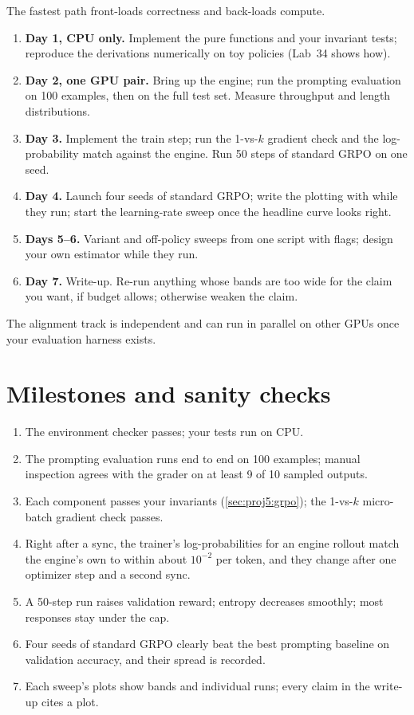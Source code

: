The fastest path front-loads correctness and back-loads compute.
\begin{enumerate}
\item \textbf{Day 1, CPU only.} Implement the pure functions and your invariant tests; reproduce the
  derivations numerically on toy policies (Lab~34 shows how).
\item \textbf{Day 2, one GPU pair.} Bring up the engine; run the prompting evaluation on 100 examples,
  then on the full test set. Measure throughput and length distributions.
\item \textbf{Day 3.} Implement the train step; run the 1-vs-$k$ gradient check and the log-probability
  match against the engine. Run 50 steps of standard GRPO on one seed.
\item \textbf{Day 4.} Launch four seeds of standard GRPO; write the plotting with 
  while they run; start the learning-rate sweep once the headline curve looks right.
\item \textbf{Days 5--6.} Variant and off-policy sweeps from one script with flags; design your own
  estimator while they run.
\item \textbf{Day 7.} Write-up. Re-run anything whose bands are too wide for the claim you want, if
  budget allows; otherwise weaken the claim.
\end{enumerate}
The alignment track is independent and can run in parallel on other GPUs once your evaluation
harness exists.

\section{Milestones and sanity checks}\label{sec:proj5:milestones}
\begin{enumerate}
\item The environment checker passes; your tests run on CPU.
\item The prompting evaluation runs end to end on 100 examples; manual inspection agrees with the
  grader on at least 9 of 10 sampled outputs.
\item Each component passes your invariants (\cref{sec:proj5:grpo}); the 1-vs-$k$ micro-batch gradient
  check passes.
\item Right after a sync, the trainer's log-probabilities for an engine rollout match the engine's own to
  within about $10^{-2}$ per token, and they change after one optimizer step and a second sync.
\item A 50-step run raises validation reward; entropy decreases smoothly; most responses stay under the
  cap.
\item Four seeds of standard GRPO clearly beat the best prompting baseline on validation accuracy, and
  their spread is recorded.
\item Each sweep's plots show bands and individual runs; every claim in the write-up cites a plot.
\end{enumerate}

